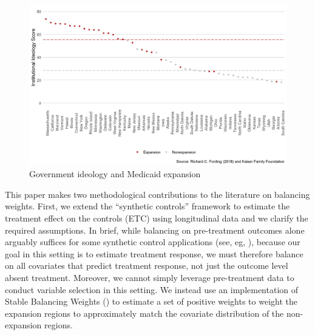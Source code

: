 \documentclass[12pt]{article}
\begin{document}
\begin{figure}
    \begin{center}
    \includegraphics[scale=0.7]{01_Plots/political-expansion-plot.png}
    \caption{Government ideology and Medicaid expansion}
    \label{fig:stateideology}
    \end{center}
\end{figure}

This paper makes two methodological contributions to the literature on balancing weights. First, we extend the ``synthetic controls'' framework to estimate the treatment effect on the controls (ETC) using longitudinal data and we clarify the required assumptions. In brief, while balancing on pre-treatment outcomes alone arguably suffices for some synthetic control applications (see, eg, \cite{botosaru2017role}), because our goal in this setting is to estimate treatment response, we must therefore balance on all covariates that predict treatment response, not just the outcome level absent treatment. Moreover, we cannot simply leverage pre-treatment data to conduct variable selection in this setting. We instead use an implementation of Stable Balancing Weights (\cite{zubizarreta2015stable}) to estimate a set of positive weights to weight the expansion regions to approximately match the covariate distribution of the non-expansion regions. 
\end{document}
